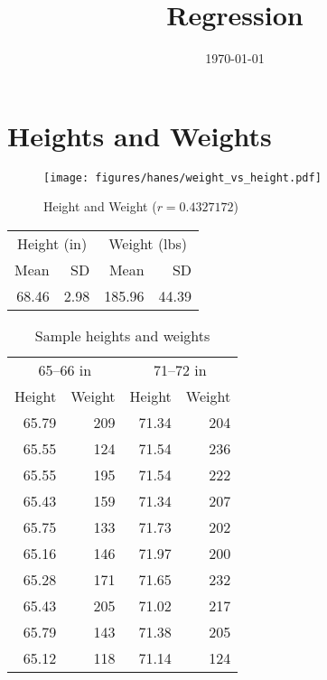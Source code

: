 \documentclass[letterpaper]{article}
\title{Regression}
\date{\today}
\author{}
\begin{document}
  \maketitle

  \section{Heights and Weights}
  \begin{figure}[H]
    \centering
    \texttt{[image: figures/hanes/weight\_vs\_height.pdf]}
    \caption{Height and Weight ($r = 0.4327172$)}
  \end{figure}
  
  \begin{table}[H]
    \centering
    \begin{tabular}{rrrr}
      \toprule
      \multicolumn{2}{c}{Height (in)} & \multicolumn{2}{c}{Weight (lbs)} \\
      Mean  & SD   & Mean   & SD \\
      \cmidrule(r){1-2}\cmidrule(l){3-4} 
      68.46 & 2.98 & 185.96 & 44.39 \\
       \bottomrule
    \end{tabular}
  \end{table}


  \newpage

  \begin{table}[H]
    \centering
    \begin{tabular}{rrrr}
      \toprule
      \multicolumn{2}{c}{65--66 in} & \multicolumn{2}{c}{71--72 in} \\
      Height & Weight & Height & Weight \\
      \cmidrule(r){1-2}\cmidrule(l){3-4} 
      65.79  & 209    & 71.34  & 204 \\
      65.55  & 124    & 71.54  & 236 \\
      65.55  & 195    & 71.54  & 222 \\
      65.43  & 159    & 71.34  & 207 \\
      65.75  & 133    & 71.73  & 202 \\
      65.16  & 146    & 71.97  & 200 \\
      65.28  & 171    & 71.65  & 232 \\
      65.43  & 205    & 71.02  & 217 \\
      65.79  & 143    & 71.38  & 205 \\
      65.12  & 118    & 71.14  & 124 \\
      \bottomrule
    \end{tabular}
    \caption{Sample heights and weights}
  \end{table}
\end{document}
